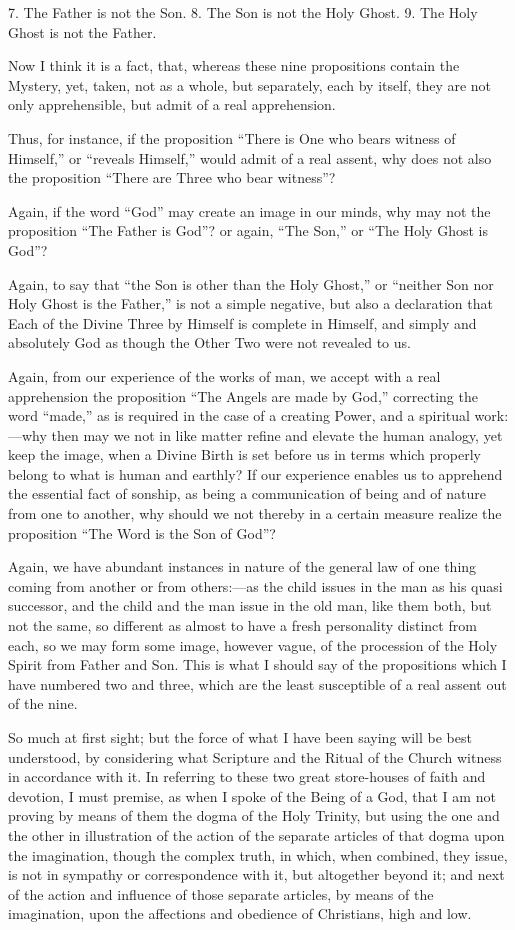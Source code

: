 7. The Father is not the Son. 8. The Son is not the Holy Ghost. 9.
The Holy Ghost is not the Father.

Now I think it is a fact, that, whereas these nine propositions
contain the Mystery, yet, taken, not as a whole, but separately, each
by itself, they are not only apprehensible, but admit of a real
apprehension.

Thus, for instance, if the proposition ``There is One who bears
witness of Himself,'' or ``reveals Himself,'' would admit
of a real assent, why does not also the proposition ``There are
Three who bear witness''?

Again, if the word ``God'' may create an image in our
minds, why may not the proposition ``The Father is God''? or
again, ``The Son,'' or ``The Holy Ghost is God''?

Again, to say that ``the Son is other than the Holy
Ghost,'' or ``neither Son nor Holy Ghost is the Father,''
is not a simple negative, but also a declaration that Each of the
Divine Three by Himself is complete in Himself, and simply and
absolutely God as though the Other Two were not revealed to us.

Again, from our experience of the works of man, we accept with a
real apprehension the proposition ``The Angels are made by
God,'' correcting the word ``made,'' as is required in the
case of a creating Power, and a spiritual work:—why then may we not
in like matter refine and elevate the human analogy, yet keep the
image, when a Divine Birth is set before us in terms which properly
belong to what is human and earthly? If our experience enables us to
apprehend the essential fact of sonship, as being a communication of
being and of nature from one to another, why should we not thereby in
a certain measure realize the proposition ``The Word is the Son of
God''?

Again, we have abundant instances in nature of the general law of
one thing coming from another or from others:—as the child issues in
the man as his quasi successor, and the child and the man issue in the
old man, like them both, but not the same, so different as almost to
have a fresh personality distinct from each, so we may form some
image, however vague, of the procession of the Holy Spirit from Father
and Son. This is what I should say of the propositions which I have numbered two and three, which are the least susceptible of a real
assent out of the nine.

So much at first sight; but the force of what I have been saying
will be best understood, by considering what Scripture and the Ritual
of the Church witness in accordance with it. In referring to these two
great store-houses of faith and devotion, I must premise, as when I
spoke of the Being of a God, that I am not proving by means of them
the dogma of the Holy Trinity, but using the one and the other in
illustration of the action of the separate articles of that dogma upon
the imagination, though the complex truth, in which, when combined,
they issue, is not in sympathy or correspondence with it, but
altogether beyond it; and next of the action and influence of those
separate articles, by means of the imagination, upon the affections
and obedience of Christians, high and low.

